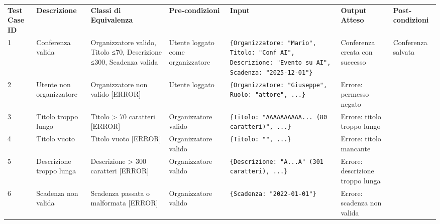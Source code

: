 \begin{sidewaystable}
\begin{tabular}{|p{2cm}|p{2cm}|p{2cm}|p{2cm}|p{5cm}|p{2cm}|p{2cm}|}
\hline
\rowcolor{SkyBlue}
\multicolumn{7}{l}{\textbf{Test Suite: Ceazione Conferenza}}\\
\hline
\rowcolor{Red}
\textbf{Test Case ID} & \textbf{Descrizione} & \textbf{Classi di Equivalenza} & \textbf{Pre-condizioni} & \textbf{Input} & \textbf{Output Atteso} & \textbf{Post-condizioni} \\
\hline
1 & Conferenza valida & Organizzatore valido, Titolo ≤70, Descrizione ≤300, Scadenza valida & Utente loggato come organizzatore & \texttt{\{Organizzatore: "Mario", Titolo: "Conf AI", Descrizione: "Evento su AI", Scadenza: "2025-12-01"\}} & Conferenza creata con successo & Conferenza salvata \\
\hline
2 & Utente non organizzatore & Organizzatore non valido [ERROR] & Utente loggato & \texttt{\{Organizzatore: "Giuseppe", Ruolo: "attore", ...\}} & Errore: permesso negato & \\
\hline
3 & Titolo troppo lungo & Titolo > 70 caratteri [ERROR] & Organizzatore valido & \texttt{\{Titolo: "AAAAAAAAAA... (80 caratteri)", ...\}} & Errore: titolo troppo lungo & \\
\hline
4 & Titolo vuoto & Titolo vuoto [ERROR] & Organizzatore valido & \texttt{\{Titolo: "", ...\}} & Errore: titolo mancante & \\
\hline
5 & Descrizione troppo lunga & Descrizione > 300 caratteri [ERROR] & Organizzatore valido & \texttt{\{Descrizione: "A...A" (301 caratteri), ...\}} & Errore: descrizione troppo lunga & \\
\hline
6 & Scadenza non valida & Scadenza passata o malformata [ERROR] & Organizzatore valido & \texttt{\{Scadenza: "2022-01-01"\}} & Errore: scadenza non valida & \\
\hline
\end{tabular}
\end{sidewaystable}


